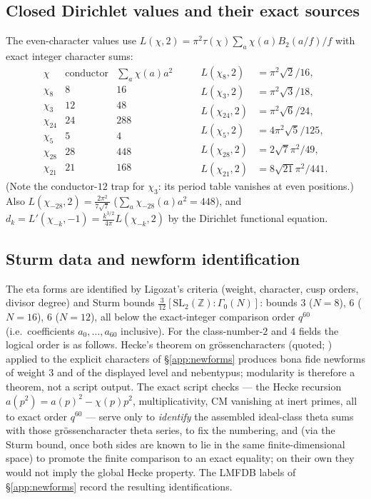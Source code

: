 \documentclass[11pt]{article}
\newcommand{\Zz}{\mathbb{Z}}
\theoremstyle{definition}
\theoremstyle{remark}
\begin{document}
\subsection{Closed Dirichlet values and their exact sources}\label{app:dirichlet}

The even-character values use
$L(\chi,2)=\pi^2\tau(\chi)\sum_a\chi(a)B_2(a/f)/f$
with exact integer character sums:
\[
\begin{array}{c|c|c}
\chi & \text{conductor} & \sum_a\chi(a)a^2\\
\hline
\chi_8 & 8 & 16\\
\chi_3 & 12 & 48\\
\chi_{24} & 24 & 288\\
\chi_5 & 5 & 4\\
\chi_{28} & 28 & 448\\
\chi_{21} & 21 & 168
\end{array}
\qquad
\begin{aligned}
  L(\chi_8,2)&=\pi^2\sqrt2/16,\\
  L(\chi_3,2)&=\pi^2\sqrt3/18,\\
  L(\chi_{24},2)&=\pi^2\sqrt6/24,\\
  L(\chi_5,2)&=4\pi^2\sqrt5/125,\\
  L(\chi_{28},2)&=2\sqrt7\pi^2/49,\\
  L(\chi_{21},2)&=8\sqrt{21}\pi^2/441.
\end{aligned}
\]
(Note the conductor-$12$ trap for $\chi_3$: its period table vanishes
at even positions.) Also
$L(\chi_{-28},2)=\frac{2\pi^2}{7\sqrt7}$ ($\sum_a\chi_{-28}(a)a^2=448$),
and $d_k=L'(\chi_{-k},-1)=\frac{k^{3/2}}{4\pi}L(\chi_{-k},2)$ by the
Dirichlet functional equation.

\subsection{Sturm data and newform identification}\label{app:sturm}

The eta forms are identified by Ligozat's criteria (weight, character,
cusp orders, divisor degree) and Sturm bounds
$\frac{3}{12}[\mathrm{SL}_2(\Zz):\Gamma_0(N)]$: bounds $3$ ($N=8$),
$6$ ($N=16$), $6$ ($N=12$), all below the exact-integer comparison
order $q^{60}$ (i.e.\ coefficients $a_0,\dots,a_{60}$ inclusive).
For the class-number-$2$ and $4$ fields the logical order is as
follows. Hecke's theorem on gr\"ossencharacters (quoted;
\cite{Miyake}) applied to the explicit characters of
\S\ref{app:newforms} produces bona fide newforms of weight $3$ and
of the displayed level and nebentypus; modularity is therefore a
theorem, not a script output. The exact script checks --- the Hecke
recursion $a(p^2)=a(p)^2-\chi(p)p^2$, multiplicativity, CM
vanishing at inert primes, all to exact order $q^{60}$ --- serve
only to \emph{identify} the assembled ideal-class theta sums with
those gr\"ossencharacter theta series, to fix the numbering, and
(via the Sturm bound, once both sides are known to lie in the same
finite-dimensional space) to promote the finite comparison to an
exact equality; on their own they would not imply the global Hecke
property. The LMFDB labels of \S\ref{app:newforms} record the
resulting identifications.
\end{document}
